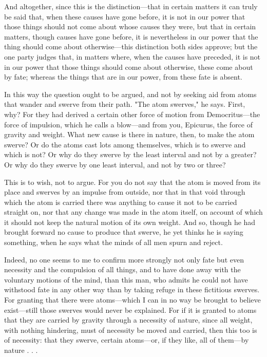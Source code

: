  And altogether, since this is the distinction—that in certain matters it can truly be said that, when these causes have gone before, it is not in our power that those things should not come about whose causes they were, but that in certain matters, though causes have gone before, it is nevertheless in our power that the thing should come about otherwise—this distinction both sides approve; but the one party judges that, in matters where, when the causes have preceded, it is not in our power that those things should come about otherwise, these come about by fate; whereas the things that are in our power, from these fate is absent.

 In this way the question ought to be argued, and not by seeking aid from atoms that wander and swerve from their path. "The atom swerves," he says. First, why? For they had derived a certain other force of motion from Democritus—the force of impulsion, which he calls a blow—and from you, Epicurus, the force of gravity and weight. What new cause is there in nature, then, to make the atom swerve? Or do the atoms cast lots among themselves, which is to swerve and which is not? Or why do they swerve by the least interval and not by a greater? Or why do they swerve by one least interval, and not by two or three?

 This is to wish, not to argue. For you do not say that the atom is moved from its place and swerves by an impulse from outside, nor that in that void through which the atom is carried there was anything to cause it not to be carried straight on, nor that any change was made in the atom itself, on account of which it should not keep the natural motion of its own weight. And so, though he had brought forward no cause to produce that swerve, he yet thinks he is saying something, when he says what the minds of all men spurn and reject.

 Indeed, no one seems to me to confirm more strongly not only fate but even necessity and the compulsion of all things, and to have done away with the voluntary motions of the mind, than this man, who admits he could not have withstood fate in any other way than by taking refuge in these fictitious swerves. For granting that there were atoms—which I can in no way be brought to believe exist—still those swerves would never be explained. For if it is granted to atoms that they are carried by gravity through a necessity of nature, since all weight, with nothing hindering, must of necessity be moved and carried, then this too is of necessity: that they swerve, certain atoms—or, if they like, all of them—by nature . . .


